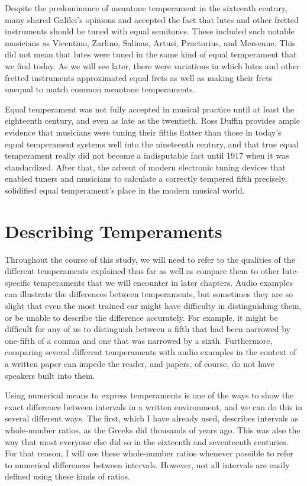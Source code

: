 Despite the predominance of meantone temperament in the sixteenth century, many shared Galilei's opinions and accepted
the fact that lutes and other fretted instruments should be tuned with equal semitones. These included such notable
musicians as Vicentino, Zarlino, Salinas, Artusi, Praetorius, and Mersenne. \autocite[19]{ML:1} This did not mean that
lutes were tuned in the same kind of equal temperament that we find today. As we will see later, there were variations
in which lutes and other fretted instruments approximated equal frets as well as making their frets unequal to match
common meantone temperaments.

Equal temperament was not fully accepted in musical practice until at least the eighteenth century, and even as late as
the twentieth. Ross Duffin provides ample evidence that musicians were tuning their fifths flatter than those in
today's equal temperament systems well into the nineteenth century, and that true equal temperament really did not
become a indisputable fact until 1917 when it was standardized. \autocite[138]{RD:1} After that, the advent of modern
electronic tuning devices that enabled tuners and musicians to calculate a correctly tempered fifth precisely,
solidified equal temperament's place in the modern musical world.

\section{Describing Temperaments}

Throughout the course of this study, we will need to refer to the qualities of the different temperaments explained thus
far as well as compare them to other lute-specific temperaments that we will encounter in later chapters. Audio
examples can illustrate the differences between temperaments, but sometimes they are so slight that even the most
trained ear might have difficulty in distinguishing them, or be unable to describe the difference accurately. For
example, it might be difficult for any of us to distinguish between a fifth that had been narrowed by one-fifth of a
comma and one that was narrowed by a sixth. Furthermore, comparing several different temperaments with audio examples
in the context of a written paper can impede the reader, and papers, of course, do not have speakers built into them.

Using numerical means to express temperaments is one of the ways to show the exact difference between intervals in a
written environment, and we can do this in several different ways. The first, which I have already used, describes
intervals as whole-number ratios, as the Greeks did thousands of years ago. This was also the way that most everyone
else did so in the sixteenth and seventeenth centuries. For that reason, I will use these whole-number ratios whenever
possible to refer to numerical differences between intervals. However, not all intervals are easily defined using these
kinds of ratios.


